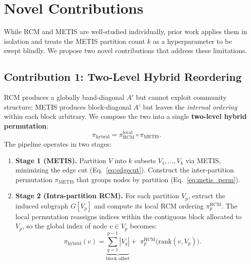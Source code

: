 \documentclass[sigconf,review]{acmart}
\begin{document}
\section{Novel Contributions}
\label{sec:novel}

While RCM and METIS are well-studied individually, prior work applies them in isolation and treats the METIS partition count $k$ as a hyperparameter to be swept blindly. We propose two novel contributions that address these limitations.

\subsection{Contribution 1: Two-Level Hybrid Reordering}
\label{sec:hybrid}

RCM produces a globally band-diagonal $A'$ but cannot exploit community structure; METIS produces block-diagonal $A'$ but leaves the \emph{internal ordering} within each block arbitrary. We compose the two into a single \textbf{two-level hybrid permutation}:
\begin{equation}\label{eq:hybrid}
    \pi_{\text{hybrid}} = \pi_{\text{RCM}}^{\text{local}} \circ \pi_{\text{METIS}}.
\end{equation}
The pipeline operates in two stages:
\begin{enumerate}
    \item \textbf{Stage 1 (METIS).} Partition $V$ into $k$ subsets $V_1,\dots,V_k$ via METIS, minimizing the edge cut (Eq.~\eqref{eq:edgecut}). Construct the inter-partition permutation $\pi_{\text{METIS}}$ that groups nodes by partition (Eq.~\eqref{eq:metis_perm}).
    \item \textbf{Stage 2 (Intra-partition RCM).}  For each partition $V_p$, extract the induced subgraph $G[V_p]$ and compute its local RCM ordering $\pi_p^{\text{RCM}}$. The local permutation reassigns indices within the contiguous block allocated to $V_p$, so the global index of node $v \in V_p$ becomes:
    \begin{equation}\label{eq:hybrid_index}
        \pi_{\text{hybrid}}(v) = \underbrace{\sum_{q=1}^{p-1} |V_q|}_{\text{block offset}} + \;\pi_p^{\text{RCM}}\!\bigl(\text{rank}(v, V_p)\bigr).
    \end{equation}
\end{enumerate}
\end{document}
